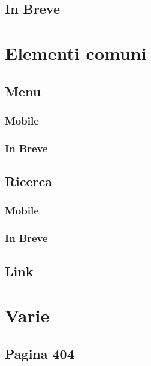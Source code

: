 \documentclass[a4paper, oneside, openany, dvipsnames, table]{article}
\begin{document}
	\subsection{In Breve}
			


\newpage
\section{Elementi comuni}
\label{sec:ElementiComuni}
	\subsection{Menu}
		\label{sec:BarraDiNavigazione}
		\label{sec:Menu}
		
		\subsubsection{Mobile}
			
		\subsubsection{In Breve}
			
	\subsection{Ricerca}	
		\label{sec:ricerca}
		
		\subsubsection{Mobile}
			
		\subsubsection{In Breve}
			
		\subsection{Link}
			
			
		



\newpage
\section{Varie}
	\subsection{Pagina 404}
		
\end{document}
